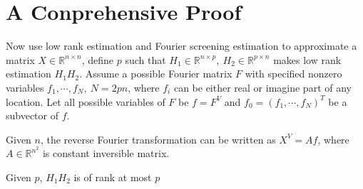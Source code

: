 \documentclass[12pt, a4paper, oneside]{article}
\begin{document}
\section{A Conprehensive Proof}
    Now use low rank estimation and Fourier screening estimation to approximate a matrix $X\in\mathbb{R}^{n\times n}$, define $p$ such that $H_1\in\mathbb{R}^{n\times p},\ H_2\in\mathbb{R}^{p\times n}$ makes low rank estimation $H_1H_2$. Assume a possible Fourier matrix $F$ with specified nonzero variables $f_1,\cdots,f_N,\ N=2pn$, where $f_i$ can be either real or imagine part of any location. Let all possible variables of $F$ be $f=F^V$ and $f_0=(f_1,\cdots,f_N)^T$ be a subvector of $f$.


    Given $n$, the reverse Fourier transformation can be written as $X^V=Af$, where $A\in\mathbb{R}^{n^2}$ is constant inversible matrix.


    Given $p$, $H_1H_2$ is of rank at most $p$
\newpage


\end{document}
